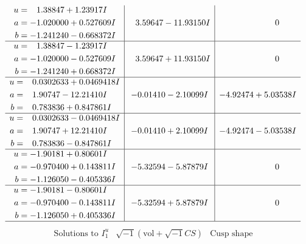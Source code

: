 \documentclass[1p]{elsarticle_modified}
\theoremstyle{definition}
\newcommand{\I}{\sqrt{-1}}
\begin{document}
$$\begin{array}{c|c|c}
\begin{aligned}
u &= \phantom{-}1.38847 + 1.23917 I \\
a &= -1.020000 + 0.527609 I \\
b &= -1.241240 - 0.668372 I\end{aligned}
 & \phantom{-}3.59647 - 11.93150 I & \phantom{-0.000000 } 0 \\ \hline\begin{aligned}
u &= \phantom{-}1.38847 - 1.23917 I \\
a &= -1.020000 - 0.527609 I \\
b &= -1.241240 + 0.668372 I\end{aligned}
 & \phantom{-}3.59647 + 11.93150 I & \phantom{-0.000000 } 0 \\ \hline\begin{aligned}
u &= \phantom{-}0.0302633 + 0.0469418 I \\
a &= \phantom{-}1.90747 - 12.21410 I \\
b &= \phantom{-}0.783836 + 0.847861 I\end{aligned}
 & -0.01410 - 2.10099 I & -4.92474 + 5.03538 I \\ \hline\begin{aligned}
u &= \phantom{-}0.0302633 - 0.0469418 I \\
a &= \phantom{-}1.90747 + 12.21410 I \\
b &= \phantom{-}0.783836 - 0.847861 I\end{aligned}
 & -0.01410 + 2.10099 I & -4.92474 - 5.03538 I \\ \hline\begin{aligned}
u &= -1.90181 + 0.80601 I \\
a &= -0.970400 + 0.143811 I \\
b &= -1.126050 - 0.405336 I\end{aligned}
 & -5.32594 - 5.87879 I & \phantom{-0.000000 } 0 \\ \hline\begin{aligned}
u &= -1.90181 - 0.80601 I \\
a &= -0.970400 - 0.143811 I \\
b &= -1.126050 + 0.405336 I\end{aligned}
 & -5.32594 + 5.87879 I & \phantom{-0.000000 } 0\\
 \hline 
 \end{array}$$\newpage$$\begin{array}{c|c|c}  
\text{Solutions to }I^u_{1}& \I (\text{vol} + \sqrt{-1}CS) & \text{Cusp shape}\\
 \hline 
\begin{aligned}

\end{aligned}
\end{array}$$
\end{document}
